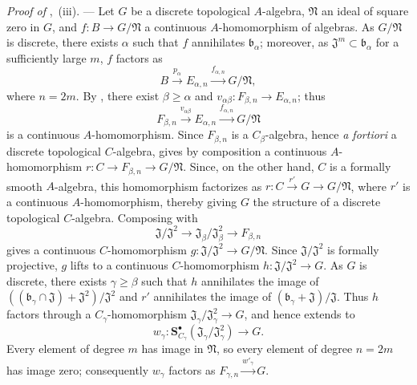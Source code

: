 \begin{env}[19.5.6.8]
\label{0.19.5.6.8}
\emph{Proof of} ,~(iii). ---
Let $G$ be a discrete topological $A$-algebra, $\mathfrak N$ an ideal of square zero in $G$, and $f:B\to G/\mathfrak N$ a continuous $A$-homomorphism of algebras.
As $G/\mathfrak N$ is discrete, there exists $\alpha$ such that $f$ annihilates $\mathfrak{b}_\alpha$; moreover, as $\mathfrak{J}^m\subset\mathfrak{b}_\alpha$ for a sufficiently large $m$, $f$ factors as
\[
  B\xrightarrow{p_\alpha}E_{\alpha,n}\xrightarrow{f_{\alpha,n}}G/\mathfrak N,
\]
where $n=2m$.
By , there exist $\beta\geq\alpha$ and $v_{\alpha\beta}:F_{\beta,n}\to E_{\alpha,n}$; thus
\begin{equation}
\label{0.19.5.6.9}
  F_{\beta,n}\xrightarrow{v_{\alpha\beta}}E_{\alpha,n}\xrightarrow{f_{\alpha,n}}G/\mathfrak N
  \tag{19.5.6.9}
\end{equation}
is a continuous $A$-homomorphism.
Since $F_{\beta,n}$ is a $C_\beta$-algebra, hence \emph{a fortiori} a discrete topological $C$-algebra,  gives by composition a continuous $A$-homomorphism
$r:C\to F_{\beta,n}\to G/\mathfrak N$.
Since, on the other hand, $C$ is a formally smooth $A$-algebra,
this homomorphism factorizes as
$r:C\xrightarrow{r'}G\to G/\mathfrak N$, where $r'$ is a continuous $A$-homomorphism, thereby giving $G$ the structure of a discrete topological $C$-algebra.
Composing  with
\[
  \mathfrak{J}/\mathfrak{J}^2\to\mathfrak{J}_\beta/\mathfrak{J}_\beta^2\to F_{\beta,n}
\]
gives a continuous $C$-homomorphism $g:\mathfrak{J}/\mathfrak{J}^2\to G/\mathfrak N$.
Since $\mathfrak{J}/\mathfrak{J}^2$ is formally projective, $g$ lifts to a continuous $C$-homomorphism $h:\mathfrak{J}/\mathfrak{J}^2\to G$.
As $G$ is discrete, there exists $\gamma\geq\beta$ such that $h$ annihilates the image of $((\mathfrak{b}_\gamma\cap\mathfrak{J})+\mathfrak{J}^2)/\mathfrak{J}^2$ and $r'$ annihilates the image of $(\mathfrak{b}_\gamma+\mathfrak{J})/\mathfrak{J}$.
Thus $h$ factors through a $C_\gamma$-homomorphism $\mathfrak{J}_\gamma/\mathfrak{J}_\gamma^2\to G$, and hence extends to
\[
  w_\gamma:\mathbf{S}_{C_\gamma}^\bullet(\mathfrak{J}_\gamma/\mathfrak{J}_\gamma^2)\to G.
\]
Every element of degree $m$ has image in $\mathfrak N$, so every element of degree $n=2m$ has image zero; consequently $w_\gamma$ factors as $F_{\gamma,n}\xrightarrow{w'_\gamma}G$.


\end{env}
